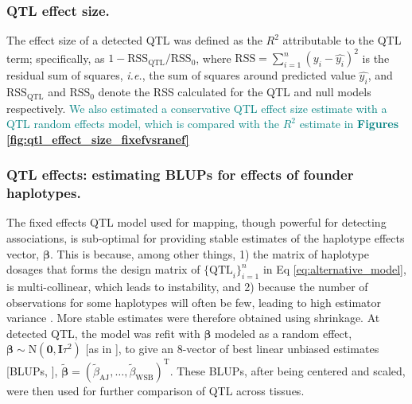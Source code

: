 \documentclass[9pt,twocolumn,twoside]{gsajnl}
\newcommand{\ie}{\emph{i.e.}\xspace}
\newcommand{\T}{^\mathrm{T}}
\newcommand{\bbeta}{\boldsymbol{\beta}}
\newcommand{\blup}{\widetilde{\bbeta}}
\newcommand{\bzero}{\mathbf{0}}
\newcommand{\bI}{\mathbf{I}}
\newcommand{\tausq}{\tau^{2}}
\newcommand{\WV}[2]{\textcolor{red}{#1\footnote{\textcolor{red}{WV: #2}}}}
\newcommand{\GKinline}[1]{\textcolor{teal}{#1}}
\begin{document}

\subsubsection{QTL effect size.}

The effect size of a detected QTL was defined as the $R^2$ attributable to the QTL term; specifically, as $1-\text{RSS}_\text{QTL} / \text{RSS}_0$, where $\text{RSS} = \sum_{i = 1}^{n}(y_{i} - \widehat{y_{i}})^{2}$ is the residual sum of squares, \ie, the sum of squares around predicted value $\widehat{y_i}$, and $\text{RSS}_{\text{QTL}}$ and $\text{RSS}_0$ denote the RSS calculated for the QTL and null models respectively. \GKinline{We also estimated a conservative QTL effect size estimate with a QTL random effects model, which is compared with the $R^{2}$ estimate in \textbf{Figures \ref{fig:qtl_effect_size_fixefvsranef}}}

\subsubsection{QTL effects: estimating BLUPs for effects of founder haplotypes.} 

The fixed effects QTL model used for mapping, though powerful for detecting associations, is sub-optimal for providing stable estimates of the haplotype effects vector, $\bbeta$. This is because, among other things, 1) the matrix of haplotype dosages that forms the design matrix of $\{\text{QTL}_i\}^n_{i=1}$ in Eq \ref{eq:alternative_model}, is multi-collinear, which leads to instability, and 2) because the number of observations for some haplotypes will often be few, leading to high estimator variance \citep{Zhang2014}. More stable estimates were therefore obtained using shrinkage. At detected QTL, the model was refit with $\bbeta$ modeled as a random effect, $\bbeta \sim \text{N}(\bzero, \bI\tausq)$ [as in \citet{Wei2016}], to give an 8-vector of best linear unbiased estimates [BLUPs, \citet{Robinson1991}], $\blup=(\widetilde{\beta}_\text{AJ},\dots,\widetilde{\beta}_\text{WSB})\T$. These BLUPs, after being centered and scaled, were then used for further comparison of QTL across tissues. 
\end{document}
